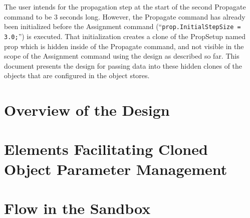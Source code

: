 \documentclass[10pt,letterpaper]{article}
\begin{document}
\noindent The user intends for the propagation step at the start of the second Propagate command to be 3 seconds long.  However, the Propagate command has already been initialized before the Assignment command (``\texttt{prop.InitialStepSize = 3.0;}'') is executed.  That initialization creates a clone of the PropSetup named prop which is hidden inside of the Propagate command, and not visible in the scope of the Assignment command using the design as described so far.  This document presents the design for passing data into these hidden clones of the objects that are configured in the object stores.

\section{Overview of the Design}

\section{Elements Facilitating Cloned Object Parameter Management}

\section{Flow in the Sandbox}
\end{document}
